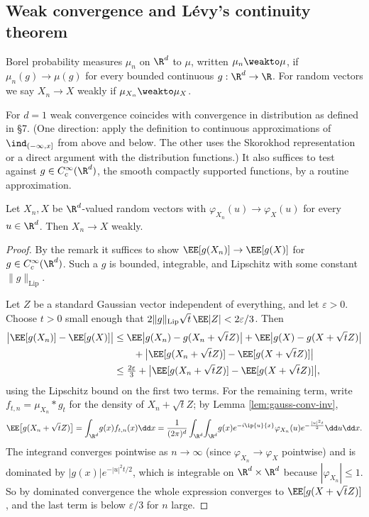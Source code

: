 \subsection{Weak convergence and L\'evy's continuity theorem}

\begin{definition}
	Borel probability measures $\mu_n$ on $\R^d$  to $\mu$, written $\mu_n \weakto\mu$, if $\mu_n(g)\to\mu(g)$ for every bounded continuous $g : \R^d\to\R$. For random vectors we say $X_n \to X$ weakly if $\mu_{X_n}\weakto\mu_X$.
\end{definition}

\begin{remark}
	For $d=1$ weak convergence coincides with convergence in distribution as defined in \S7. (One direction: apply the definition to continuous approximations of $\ind_{(-\infty,x]}$ from above and below. The other uses the Skorokhod representation or a direct argument with the distribution functions.) It also suffices to test against $g \in C_c^\infty(\R^d)$, the smooth compactly supported functions, by a routine approximation.
\end{remark}

\begin{theorem}\label{thm:levy}
	Let $X_n, X$ be $\R^d$-valued random vectors with $\varphi_{X_n}(u)\to\varphi_X(u)$ for every $u \in\R^d$. Then $X_n \to X$ weakly.
\end{theorem}
\begin{proof}
	By the remark it suffices to show $\EE[g(X_n)]\to\EE[g(X)]$ for $g \in C_c^\infty(\R^d)$. Such a $g$ is bounded, integrable, and Lipschitz with some constant $\|g\|_{\mathrm{Lip}}$.

	Let $Z$ be a standard Gaussian vector independent of everything, and let $\varepsilon>0$. Choose $t>0$ small enough that $2\|g\|_{\mathrm{Lip}}\sqrt t\,\EE|Z| < 2\varepsilon/3$. Then
	\begin{align*}
		\big|\EE[g(X_n)]-\EE[g(X)]\big| &\leq \EE\big|g(X_n)-g(X_n+\sqrt tZ)\big| + \EE\big|g(X)-g(X+\sqrt tZ)\big|\\
		&\qquad + \big|\EE[g(X_n+\sqrt tZ)]-\EE[g(X+\sqrt tZ)]\big|\\
		&\leq \tfrac{2\varepsilon}{3}+\big|\EE[g(X_n+\sqrt tZ)]-\EE[g(X+\sqrt tZ)]\big|,
	\end{align*}
	using the Lipschitz bound on the first two terms. For the remaining term, write $f_{t,n}=\mu_{X_n}*g_t$ for the density of $X_n+\sqrt tZ$; by Lemma \ref{lem:gauss-conv-inv},
	$$
	\EE\big[g(X_n+\sqrt tZ)\big]=\int_{\R^d}\!g(x)f_{t,n}(x)\dd x = \frac{1}{(2\pi)^d}\int_{\R^d}\!\int_{\R^d}\!g(x)e^{-i\ip{u}{x}}\varphi_{X_n}(u)e^{-\frac{|u|^2t}{2}}\dd u\dd x.
	$$
	The integrand converges pointwise as $n \to\infty$ (since $\varphi_{X_n}\to\varphi_X$ pointwise) and is dominated by $|g(x)|e^{-|u|^2t/2}$, which is integrable on $\R^d\times\R^d$ because $|\varphi_{X_n}|\leq1$. So by dominated convergence the whole expression converges to $\EE[g(X+\sqrt tZ)]$, and the last term is below $\varepsilon/3$ for $n$ large.
\end{proof}

